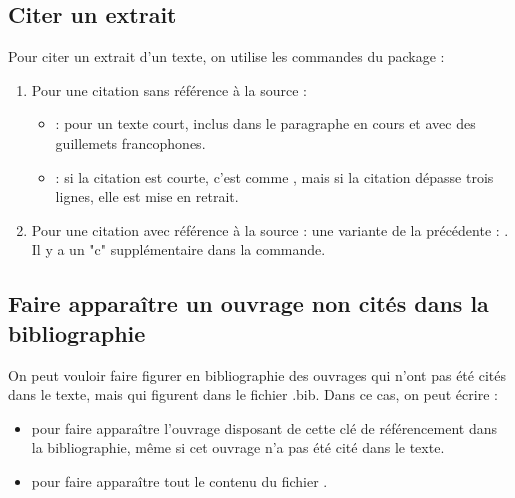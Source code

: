 \subsection{Citer un extrait}

Pour citer un extrait d'un texte, on utilise les commandes du package  :
\begin{enumerate}
	\item Pour une citation sans référence à la source :
		\begin{itemize}
			\item {} : pour un texte court, inclus dans le paragraphe en cours et avec des guillemets francophones.
			\item {} : si la citation est courte, c'est comme \inlatex{\enquote}, mais si la citation dépasse trois lignes, elle est mise en retrait.
		\end{itemize}
	\item Pour une citation avec référence à la source : une variante de la précédente : . \attention Il y a un "c" supplémentaire dans la commande.
\end{enumerate}




\subsection{Faire apparaître un ouvrage non cités dans la bibliographie}

On peut vouloir faire figurer en bibliographie des ouvrages qui n'ont pas été cités dans le texte, mais qui figurent dans le fichier .bib. Dans ce cas, on peut écrire :
\begin{itemize}
	\item \inlatex{\nocite{clé}} pour faire apparaître l'ouvrage disposant de cette clé de référencement dans la bibliographie, même si cet ouvrage n'a pas été cité dans le texte.
	\item \inlatex{\nocite{*}} pour faire apparaître tout le contenu du fichier .
\end{itemize}





